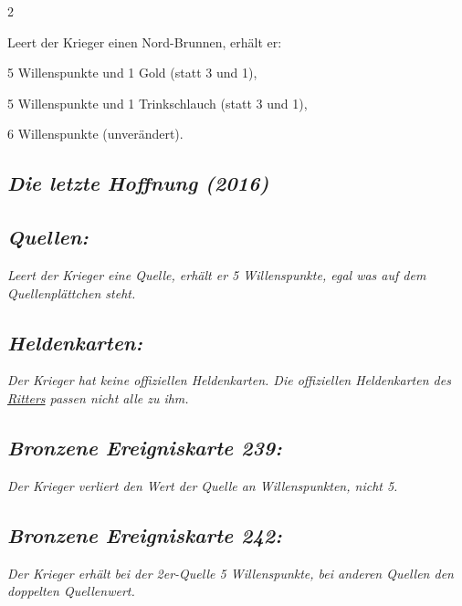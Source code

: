 \documentclass[10pt, a4paper, oneside]{book}
\newcommand{\fan}[1]{\textit{#1}}
\begin{document}
\begin{multicols*}{2}
\begin{bgcolor}
Leert der Krieger einen Nord-Brunnen, erhält er:
\supercite{DRidN:Begleitheft}

\bullet{} 5 Willenspunkte und 1 Gold (statt 3 und 1),

\bullet{} 5 Willenspunkte und 1 Trinkschlauch (statt 3 und 1),

\bullet{} 6 Willenspunkte (unverändert).

\end{bgcolor}




\columnbreak


\begin{bgcolor}
\section{\fan{Die letzte Hoffnung (2016)}}

\subsection{\fan{Quellen:}}

\fan{Leert der Krieger eine Quelle, erhält er 5 Willenspunkte, egal was auf dem Quellenplättchen steht.}


\subsection{\fan{Heldenkarten:}}

\fan{Der Krieger hat keine offiziellen Heldenkarten. Die offiziellen Heldenkarten des \hyperref[Ritter]{Ritters} passen nicht alle zu ihm.}



\subsection{\fan{Bronzene Ereigniskarte 239:}}

\fan{Der Krieger verliert den Wert der Quelle an Willenspunkten, nicht 5.}


\subsection{\fan{Bronzene Ereigniskarte 242:}}

\fan{Der Krieger erhält bei der 2er-Quelle 5 Willenspunkte, bei anderen Quellen den doppelten Quellenwert.}

\end{bgcolor}


\begin{bgcolor}[color-BB]

\end{bgcolor}
\end{multicols*}
\end{document}
